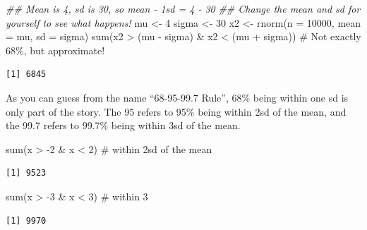 \documentclass[
  letterpaper,
  DIV=11,
  numbers=noendperiod,
  oneside]{scrreprt}
\newenvironment{Shaded}{\begin{snugshade}}{\end{snugshade}}
\newcommand{\AttributeTok}[1]{\textcolor[rgb]{0.40,0.45,0.13}{#1}}
\newcommand{\CommentTok}[1]{\textcolor[rgb]{0.37,0.37,0.37}{#1}}
\newcommand{\DecValTok}[1]{\textcolor[rgb]{0.68,0.00,0.00}{#1}}
\newcommand{\DocumentationTok}[1]{\textcolor[rgb]{0.37,0.37,0.37}{\textit{#1}}}
\newcommand{\FunctionTok}[1]{\textcolor[rgb]{0.28,0.35,0.67}{#1}}
\newcommand{\NormalTok}[1]{\textcolor[rgb]{0.00,0.23,0.31}{#1}}
\newcommand{\OtherTok}[1]{\textcolor[rgb]{0.00,0.23,0.31}{#1}}
\newcommand{\SpecialCharTok}[1]{\textcolor[rgb]{0.37,0.37,0.37}{#1}}
\begin{document}
\begin{Shaded}
\begin{Highlighting}[]
\DocumentationTok{\#\# Mean is 4, sd is 30, so mean {-} 1sd = 4 {-} 30}
\DocumentationTok{\#\# Change the mean and sd for yourself to see what happens!}
\NormalTok{mu }\OtherTok{\textless{}{-}} \DecValTok{4}
\NormalTok{sigma }\OtherTok{\textless{}{-}} \DecValTok{30}
\NormalTok{x2 }\OtherTok{\textless{}{-}} \FunctionTok{rnorm}\NormalTok{(}\AttributeTok{n =} \DecValTok{10000}\NormalTok{, }\AttributeTok{mean =}\NormalTok{ mu, }\AttributeTok{sd =}\NormalTok{ sigma)}
\FunctionTok{sum}\NormalTok{(x2 }\SpecialCharTok{\textgreater{}}\NormalTok{ (mu }\SpecialCharTok{{-}}\NormalTok{ sigma) }\SpecialCharTok{\&}\NormalTok{ x2 }\SpecialCharTok{\textless{}}\NormalTok{ (mu }\SpecialCharTok{+}\NormalTok{ sigma)) }\CommentTok{\# Not exactly 68\%, but approximate!}
\end{Highlighting}
\end{Shaded}

\begin{verbatim}
[1] 6845
\end{verbatim}

As you can guess from the name ``68-95-99.7 Rule'', 68\% being within
one sd is only part of the story. The 95 refers to 95\% being within 2sd
of the mean, and the 99.7 refers to 99.7\% being within 3sd of the mean.

\begin{Shaded}
\begin{Highlighting}[]
\FunctionTok{sum}\NormalTok{(x }\SpecialCharTok{\textgreater{}} \SpecialCharTok{{-}}\DecValTok{2} \SpecialCharTok{\&}\NormalTok{ x }\SpecialCharTok{\textless{}} \DecValTok{2}\NormalTok{) }\CommentTok{\# within 2sd of the mean}
\end{Highlighting}
\end{Shaded}

\begin{verbatim}
[1] 9523
\end{verbatim}

\begin{Shaded}
\begin{Highlighting}[]
\FunctionTok{sum}\NormalTok{(x }\SpecialCharTok{\textgreater{}} \SpecialCharTok{{-}}\DecValTok{3} \SpecialCharTok{\&}\NormalTok{ x }\SpecialCharTok{\textless{}} \DecValTok{3}\NormalTok{) }\CommentTok{\# within 3}
\end{Highlighting}
\end{Shaded}

\begin{verbatim}
[1] 9970
\end{verbatim}
\end{document}

